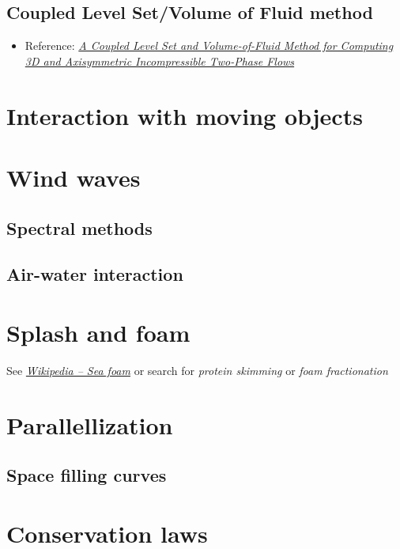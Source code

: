 \documentclass[]{report}
\begin{document}
\section{Coupled Level Set/Volume of Fluid  method}

\begin{itemize}
    \item Reference: \textit{\href{http://pages.csam.montclair.edu/~yecko/icodes/SussmanPuckett_LevelSetVOF.pdf}{A Coupled Level Set and Volume-of-Fluid Method for Computing 3D and Axisymmetric Incompressible Two-Phase Flows}}
\end{itemize}

\chapter{Interaction with moving objects}

\chapter{Wind waves}

\section{Spectral methods}

\section{Air-water interaction}

\chapter{Splash and foam}

See \textit{\href{http://en.wikipedia.org/wiki/Sea_foam}{Wikipedia -- Sea foam}} or search for \textit{protein skimming} or \textit{foam fractionation}

\chapter{Parallellization}

\section{Space filling curves}

\chapter{Conservation laws}
\end{document}
